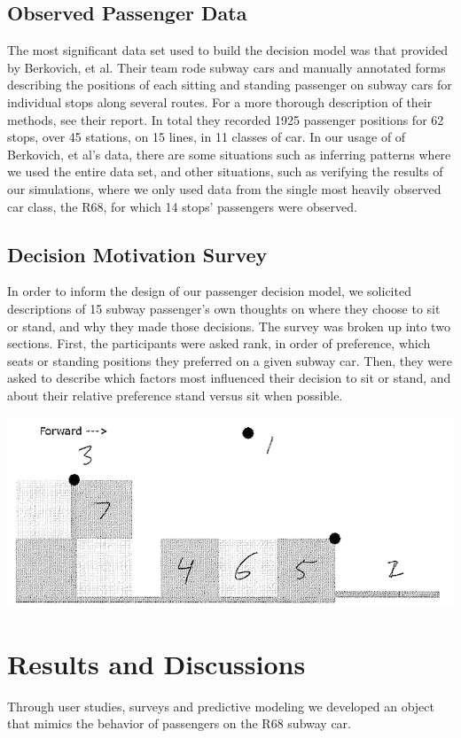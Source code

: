 \documentclass{acm_proc_article-sp}
\begin{document}
\subsection{Observed Passenger Data}
The most significant data set used to build the decision model was that provided by Berkovich, et al. Their team rode subway cars and manually annotated forms describing the positions of each sitting and standing passenger on subway cars for individual stops along several routes. For a more thorough description of their methods, see their report\cite{berkovich2013observed}. In total they recorded 1925 passenger positions for 62 stops, over 45 stations, on 15 lines, in 11 classes of car. In our usage of of Berkovich, et al's data, there are some situations such as inferring patterns where we used the entire data set, and other situations, such as verifying the results of our simulations, where we only used data from the single most heavily observed car class, the R68, for which 14 stops' passengers were observed.

\subsection{Decision Motivation Survey}
In order to inform the design of our passenger decision model, we solicited descriptions of 15 subway passenger's own thoughts on where they choose to sit or stand, and why they made those decisions. The survey was broken up into two sections. First, the participants were asked rank, in order of preference, which seats or standing positions they preferred on a given subway car. Then, they were asked to describe which factors most influenced their decision to sit or stand, and about their relative preference stand versus sit when possible.

\includegraphics{survey_response}

\section{Results and Discussions}
Through user studies, surveys and predictive modeling we developed an object that mimics the behavior of passengers on the R68 subway car.




\end{document}

